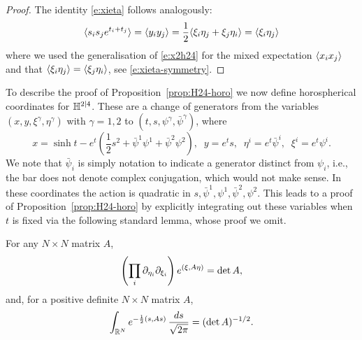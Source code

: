 \documentclass[11pt]{amsart}
\numberwithin{equation}{section}
\numberwithin{theorem}{section}
\begin{document}
\begin{proof}
  The identity \eqref{e:xieta} follows analogously:
    \begin{equation}
      \langle s_is_je^{t_i+t_j} \rangle= \langle y_iy_j \rangle = \frac12 \langle \xi_i\eta_j+\xi_j\eta_i \rangle = \langle \xi_i\eta_j \rangle
    \end{equation}
    where we used the generalisation of \eqref{e:x2h24} for
    the mixed expectation $\langle x_ix_j \rangle$ and that
    $\langle \xi_i\eta_j \rangle = \langle \xi_j\eta_i \rangle$, see \eqref{e:xieta-symmetry}.
\end{proof}

To describe the proof of Proposition~\ref{prop:H24-horo}
we now define horospherical coordinates for $\mathbb{H}^{2|4}$.
These are a change of generators from the variables
$(x,y,\xi^{\gamma},\eta^{\gamma})$ with $\gamma=1,2$ to
$(t,s,\psi^{\gamma},\bar\psi^{\gamma})$, where 
\begin{equation}
  \label{eq:horo}
  x = \sinh t - e^{t}(\frac{1}{2}s^{2} + \bar\psi^{1}\psi^{1} +
  \bar\psi^{2}\psi^{2}), \;\;
  y = e^{t}s,\;\;
  \eta^{i} = e^{t}\bar\psi^{i}, \;\;
  \xi^{i} = e^{t}\psi^{i}.
\end{equation}
We note that $\bar\psi_{i}$ is simply notation to indicate a generator
distinct from $\psi_{i}$, i.e., the bar does not denote complex
conjugation, which would not make sense. In these coordinates the
action is quadratic in
$s, \bar\psi^{1},\psi^{1},\bar\psi^{2},\psi^{2}$. This leads to a
proof of Proposition~\ref{prop:H24-horo} by explicitly integrating out
these variables when $t$ is fixed via the following standard lemma,
whose proof we omit.
\begin{lemma}
  \label{lem:FG}
  For any $N \times N$ matrix $A$,
  \begin{equation}
    \left({\prod_i \partial_{\eta_i}\partial_{\xi_i}}\right) e^{(\xi,A\eta)} = \det A,
  \end{equation}
  and, for a positive definite $N\times N$ matrix $A$,
  \begin{equation}
    \int_{\mathbb{R}^{N}} e^{-\frac12 (s,As)} \, \frac{ds}{\sqrt{2\pi}} = (\det A)^{ -1/2}.
  \end{equation}
\end{lemma}
\end{document}
